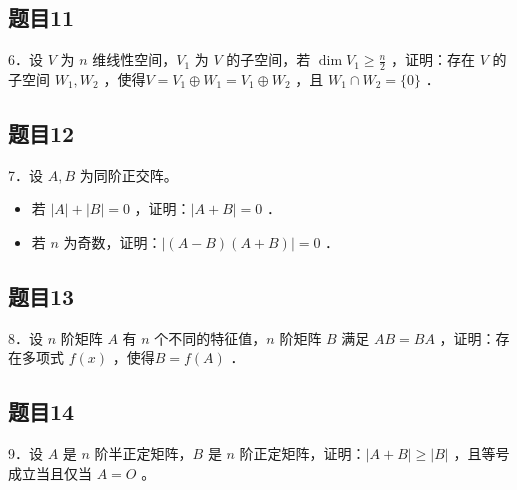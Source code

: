 \documentclass{article}
\begin{document}
\subsection{题目11}
6．设 \(V\) 为 \(n\) 维线性空间，\(V_{1}\) 为 \(V\) 的子空间，若 \(\operatorname{dim} V_{1} \geq \frac{n}{2}\) ，证明：存在 \(V\) 的子空间 \(W_{1}, W_{2}\) ，使得\(V=V_{1} \oplus W_{1}=V_{1} \oplus W_{2}\) ，且 \(W_{1} \cap W_{2}=\{0\}\) ．

\subsection{题目12}
7．设 \(A, B\) 为同阶正交阵。

\begin{itemize}
  \item[（1）] 若 \(|A|+|B|=0\) ，证明：\(|A+B|=0\) ．
  \item[（2）] 若 \(n\) 为奇数，证明：\(|(A-B)(A+B)|=0\) ．
\end{itemize}

\subsection{题目13}
8．设 \(n\) 阶矩阵 \(A\) 有 \(n\) 个不同的特征值，\(n\) 阶矩阵 \(B\) 满足 \(A B=B A\) ，证明：存在多项式 \(f(x)\) ，使得\(B=f(A)\) ．

\subsection{题目14}
9．设 \(A\) 是 \(n\) 阶半正定矩阵，\(B\) 是 \(n\) 阶正定矩阵，证明：\(|A+B| \geq|B|\) ，且等号成立当且仅当 \(A=O\) 。
\end{document}
